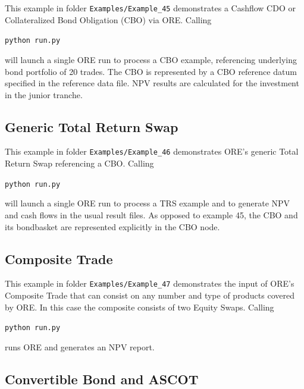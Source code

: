 This example in folder {\tt Examples/Example\_45} demonstrates a Cashflow CDO or Collateralized Bond Obligation (CBO) via ORE. Calling

\medskip
\centerline{\tt python run.py}

\medskip
will launch a single ORE run to process a CBO example, referencing underlying bond portfolio of 20 trades.
The CBO is represented by a CBO reference datum specified in the reference data file.
NPV results are calculated for the investment in the junior tranche.

\subsection{Generic Total Return Swap}%

This example in folder {\tt Examples/Example\_46} demonstrates ORE's generic Total Return Swap referencing a CBO.
Calling

\medskip
\centerline{\tt python run.py}

\medskip
will launch a single ORE run to process a TRS example and to generate NPV and cash flows in the usual result files.
As opposed to example 45, the CBO and its bondbasket are represented explicitly in the CBO node.

\subsection{Composite Trade}%

This example in folder {\tt Examples/Example\_47} demonstrates the input of ORE's Composite Trade that can consist on any number
and type of products covered by ORE. In this case the composite consists of two Equity Swaps.
Calling

\medskip
\centerline{\tt python run.py}

\medskip
runs ORE and generates an NPV report.

\subsection{Convertible Bond and ASCOT}%

